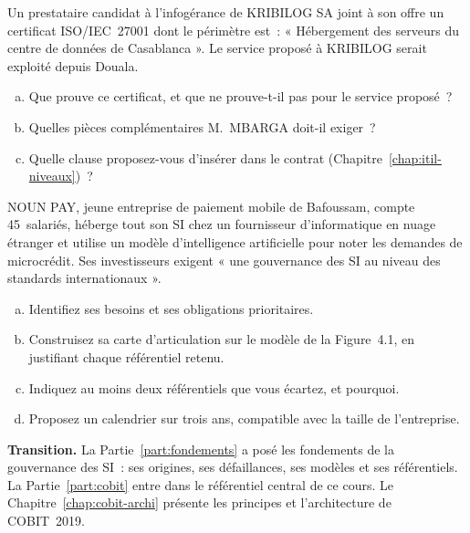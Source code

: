 \begin{boxexo}[title={\ding{45}\quad Exercice~4.2. Lire un certificat \niveaumoyen}]
Un prestataire candidat à l'infogérance de KRIBILOG SA joint à son offre
un certificat ISO/IEC~27001 dont le périmètre est~: « Hébergement des
serveurs du centre de données de Casablanca ». Le service proposé à
KRIBILOG serait exploité depuis Douala.
\begin{enumerate}[(a)]
    \item Que prouve ce certificat, et que ne prouve-t-il pas pour le
          service proposé~?
    \item Quelles pièces complémentaires M.~MBARGA doit-il exiger~?
    \item Quelle clause proposez-vous d'insérer dans le contrat
          (Chapitre~\ref{chap:itil-niveaux})~?
\end{enumerate}
\end{boxexo}

\begin{boxexo}[title={\ding{45}\quad Exercice~4.3. La carte de NOUN PAY \niveauexpert}]
NOUN PAY, jeune entreprise de paiement mobile de Bafoussam, compte
45~salariés, héberge tout son SI chez un fournisseur d'informatique en
nuage étranger et utilise un modèle d'intelligence artificielle pour
noter les demandes de microcrédit. Ses investisseurs exigent « une
gouvernance des SI au niveau des standards internationaux ».
\begin{enumerate}[(a)]
    \item Identifiez ses besoins et ses obligations prioritaires.
    \item Construisez sa carte d'articulation sur le modèle de la
          Figure~4.1, en justifiant chaque référentiel retenu.
    \item Indiquez au moins deux référentiels que vous écartez, et
          pourquoi.
    \item Proposez un calendrier sur trois ans, compatible avec la taille
          de l'entreprise.
\end{enumerate}
\end{boxexo}

\bigskip

\begin{boxinfo}
\textbf{Transition.} La Partie~\ref{part:fondements} a posé les fondements
de la gouvernance des SI~: ses origines, ses défaillances, ses modèles et
ses référentiels. La Partie~\ref{part:cobit} entre dans le référentiel
central de ce cours. Le Chapitre~\ref{chap:cobit-archi} présente les
principes et l'architecture de COBIT~2019.
\end{boxinfo}
